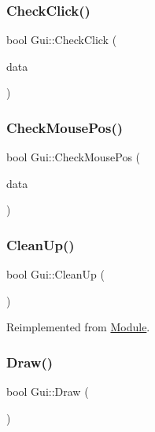 \subsubsection{\texorpdfstring{CheckClick()}{CheckClick()}}
{\footnotesize\ttfamily bool Gui\+::\+Check\+Click (\begin{DoxyParamCaption}\item[{\mbox{\hyperlink{class_u_i___element}{U\+I\+\_\+\+Element}} $\ast$}]{data }\end{DoxyParamCaption})}

\mbox{\label{class_gui_ab0a87905fba215e5334f80cb94fe9f77}} 
\subsubsection{\texorpdfstring{CheckMousePos()}{CheckMousePos()}}
{\footnotesize\ttfamily bool Gui\+::\+Check\+Mouse\+Pos (\begin{DoxyParamCaption}\item[{\mbox{\hyperlink{class_u_i___element}{U\+I\+\_\+\+Element}} $\ast$}]{data }\end{DoxyParamCaption})}

\mbox{\label{class_gui_aefd3608cd8ada040443efcffb1f316f3}} 
\subsubsection{\texorpdfstring{CleanUp()}{CleanUp()}}
{\footnotesize\ttfamily bool Gui\+::\+Clean\+Up (\begin{DoxyParamCaption}{ }\end{DoxyParamCaption})\hspace{0.3cm}{\ttfamily [virtual]}}



Reimplemented from \mbox{\hyperlink{class_module_a77d7a006e42c0bd10110e1adbd4598cb}{Module}}.

\mbox{\label{class_gui_a87a850ab175f2ccb095fd2c033b4780c}} 
\subsubsection{\texorpdfstring{Draw()}{Draw()}}
{\footnotesize\ttfamily bool Gui\+::\+Draw (\begin{DoxyParamCaption}{ }\end{DoxyParamCaption})}

